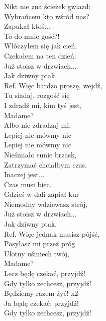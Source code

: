 
Nikt nie zna ścieżek gwiazd; \tab{}\\
Wybrańcem kto wśród nas? \tab{}\\
Zapukał ktoś... \tab{}\tab{}\\
To do mnie gość?! \tab{}\\
\hop
Włóczyłem się jak cień, \tab{}\\
Czekałem na ten dzień; \tab{}\\
Już stoisz w drzwiach... \tab{}\\
Jak dziwny ptak. \tab{}\\
\hops
Ref. Więc bardzo proszę, wejdź, \\
 Tu siadaj, rozgość się \tab{}\\
 I zdradź mi, kim tyś jest,\tab{} \\
 Madame?\tab{}\tab{} \\
 Albo nie zdradzaj mi, \tab{}\\
 Lepiej nie mówmy nic \tab{}\\
 Lepiej nie mówmy nic \tab{}\\
\hops
Nieśmiało sunie brzask, \\
Zatrzymać chciałbym czas. \\
Inaczej jest... \\
Czas musi biec. \\
\hop
Gdzieś w dali zapiał kur \\
Niemodny wdziewasz strój, \\
Już stoisz w drzwiach... \\
Jak dziwny ptak. \\
\hops
Ref. Więc jednak musisz pójść,\tab{}\tab{$|$}\\
 Posyłasz mi przez próg \tab{}\tab{$|$}\\
 Ulotny uśmiech twój, \tab{}\tab{$|$}\\
 Madame? \tab{}\tab{} \tab{$|$}\\
 Lecz będę czekać, przyjdź! \tab{$|$}\\
 Gdy tylko zechcesz, przyjdź! \tab{$|$}\\
 Będziemy razem żyć! \tab{}\tab{$|$} x2\\
\hops
{} Ja będę czekać, przyjdź! \\
 Gdy tylko zechcesz, przyjdź! \\
